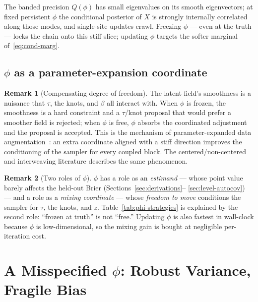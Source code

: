 \documentclass[11pt]{article}
\theoremstyle{definition}
\newtheorem{remark}{Remark}
\begin{document}
The banded precision $Q(\phi)$ has small eigenvalues on its smooth
eigenvectors; at fixed persistent $\phi$ the conditional posterior of
$X$ is strongly internally correlated along those modes, and
single-site updates crawl. Freezing $\phi$ --- even at the truth ---
locks the chain onto this stiff slice; updating $\phi$ targets the
softer marginal of~\eqref{eq:cond-marg}.

\subsection{$\phi$ as a parameter-expansion coordinate}

\begin{remark}[Compensating degree of freedom]
\label{rem:param-expansion}
The latent field's smoothness is a nuisance that $\tau$, the knots,
and $\beta$ all interact with. When $\phi$ is frozen, the smoothness
is a hard constraint and a $\tau$/knot proposal that would prefer a
smoother field is rejected; when $\phi$ is free, $\phi$ absorbs the
coordinated adjustment and the proposal is accepted. This is the
mechanism of parameter-expanded data augmentation~\cite{liu1999px}:
an extra coordinate aligned with a stiff direction improves the
conditioning of the sampler for every coupled block. The
centered/non-centered and interweaving literature
\cite{prs2007, yu2011interweaving} describes the same phenomenon.
\end{remark}

\begin{remark}[Two roles of $\phi$]
\label{rem:two-roles}
$\phi$ has a role as an \emph{estimand} --- whose point value barely
affects the held-out Brier (Sections~\ref{sec:derivations}--%
\ref{sec:level-autocov}) --- and a role as a \emph{mixing coordinate}
--- whose \emph{freedom to move} conditions the sampler for $\tau$, the
knots, and $z$. Table~\ref{tab:phi-strategies} is explained by the
second role: ``frozen at truth'' is not ``free.'' Updating $\phi$ is
also fastest in wall-clock because $\phi$ is low-dimensional, so the
mixing gain is bought at negligible per-iteration cost.
\end{remark}

\section{A Misspecified $\phi$: Robust Variance, Fragile Bias}
\label{sec:misspecified}
\end{document}
